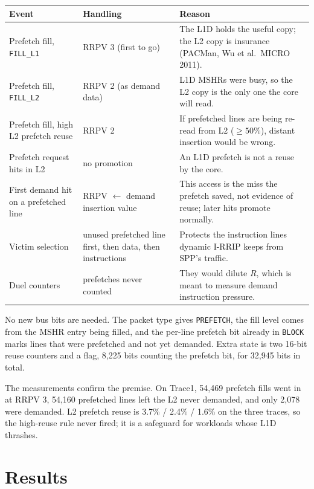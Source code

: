 \documentclass[12pt]{report}
\newcommand{\cfg}[1]{\texttt{#1}}
\begin{document}
\begin{table}[H]\centering\small
\begin{tabular}{p{3.2cm} p{4.6cm} p{6.6cm}}
\toprule
Event & Handling & Reason\\
\midrule
Prefetch fill, \cfg{FILL\_L1} & RRPV 3 (first to go) & The L1D holds the useful copy; the L2 copy is insurance (PACMan, Wu et al.\ MICRO 2011). \\
Prefetch fill, \cfg{FILL\_L2} & RRPV 2 (as demand data) & L1D MSHRs were busy, so the L2 copy is the only one the core will read. \\
Prefetch fill, high L2 prefetch reuse & RRPV 2 & If prefetched lines are being re-read from L2 ($\geq50\%$), distant insertion would be wrong. \\
Prefetch request hits in L2 & no promotion & An L1D prefetch is not a reuse by the core. \\
First demand hit on a prefetched line & RRPV $\leftarrow$ demand insertion value & This access is the miss the prefetch saved, not evidence of reuse; later hits promote normally. \\
Victim selection & unused prefetched line first, then data, then instructions & Protects the instruction lines dynamic I-RRIP keeps from SPP's traffic. \\
Duel counters & prefetches never counted & They would dilute $R$, which is meant to measure demand instruction pressure. \\
\bottomrule
\end{tabular}
\end{table}

No new bus bits are needed. The packet type gives \cfg{PREFETCH}, the fill
level comes from the MSHR entry being filled, and the per-line prefetch bit
already in \cfg{BLOCK} marks lines that were prefetched and not yet demanded.
Extra state is two 16-bit reuse counters and a flag, 8,225 bits counting the
prefetch bit, for 32,945 bits in total.

The measurements confirm the premise. On Trace1, 54,469 prefetch fills went
in at RRPV 3, 54,160 prefetched lines left the L2 never demanded, and only
2,078 were demanded. L2 prefetch reuse is 3.7\% / 2.4\% / 1.6\% on the three
traces, so the high-reuse rule never fired; it is a safeguard for workloads
whose L1D thrashes.

\section{Results}
\end{document}
